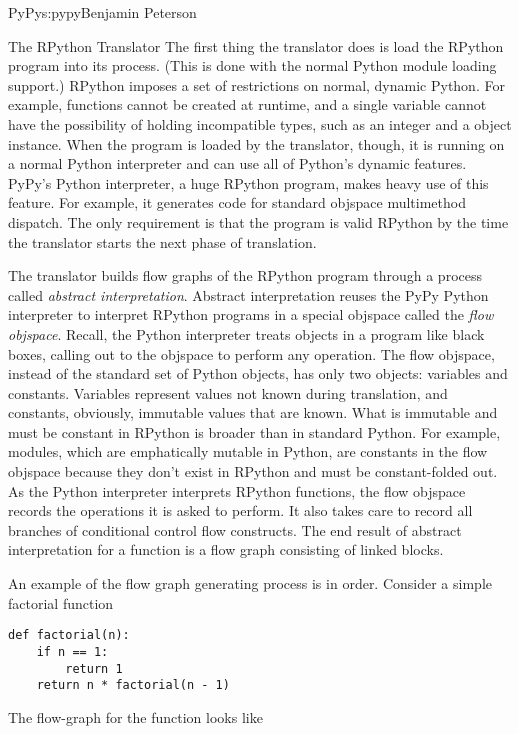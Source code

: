 \begin{aosachapter}{PyPy}{s:pypy}{Benjamin Peterson}
\begin{aosasect1}{The RPython Translator}
The first thing the translator does is load the RPython program into its
process. (This is done with the normal Python module loading support.) RPython
imposes a set of restrictions on normal, dynamic Python. For example, functions
cannot be created at runtime, and a single variable cannot have the possibility
of holding incompatible types, such as an integer and a object instance. When
the program is loaded by the translator, though, it is running on a normal
Python interpreter and can use all of Python's dynamic features. PyPy's Python
interpreter, a huge RPython program, makes heavy use of this feature. For
example, it generates code for standard objspace multimethod dispatch. The only
requirement is that the program is valid RPython by the time the translator
starts the next phase of translation.

The translator builds flow graphs of the RPython program through a process
called \emph{abstract interpretation}. Abstract interpretation reuses the PyPy
Python interpreter to interpret RPython programs in a special objspace called
the \emph{flow objspace}. Recall, the Python interpreter treats objects in a
program like black boxes, calling out to the objspace to perform any
operation. The flow objspace, instead of the standard set of Python objects, has
only two objects: variables and constants. Variables represent values not known
during translation, and constants, obviously, immutable values that are
known. What is immutable and must be constant in RPython is broader than in
standard Python. For example, modules, which are emphatically mutable in Python,
are constants in the flow objspace because they don't exist in RPython and must
be constant-folded out. As the Python interpreter interprets RPython functions,
the flow objspace records the operations it is asked to perform. It also takes
care to record all branches of conditional control flow constructs. The end
result of abstract interpretation for a function is a flow graph consisting of
linked blocks.

An example of the flow graph generating process is in order. Consider a simple
factorial function

\begin{verbatim}
def factorial(n):
    if n == 1:
        return 1
    return n * factorial(n - 1)
\end{verbatim}

The flow-graph for the function looks like 



\end{aosasect1}
\end{aosachapter}
